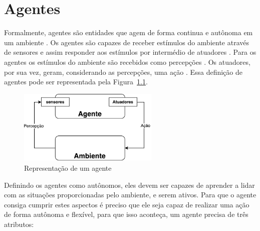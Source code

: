 \chapter{\label{chap:agentes}Agentes}


Formalmente, agentes são entidades que agem de forma continua e autônoma em um ambiente \cite{agent1993oriented}. 
Os agentes são capazes de receber estímulos do ambiente através de sensores e assim responder aos estímulos por intermédio de atuadores \cite{intelligence2003modern}. 
Para os agentes os estímulos do ambiente são recebidos como percepções \cite{intelligence2003modern}. 
Os atuadores, por sua vez, geram, considerando as percepções, uma ação \cite{intelligence2003modern}. 
Essa definição de agentes pode ser representada pela Figura~\ref{fig:agente}.

\begin{figure}[ht]
	\centering
	\includegraphics[width=0.6\textwidth]{fig/agente.pdf}
	\caption{Representação de um agente}
	\label{fig:agente}
\end{figure} 

Definindo os agentes como autônomos, eles devem ser capazes de aprender a lidar com as situações proporcionadas pelo ambiente, e serem ativos. 
Para que o agente consiga cumprir estes aspectos é preciso que ele seja capaz de realizar uma ação de forma autônoma e flexível, para que isso aconteça, um agente precisa de três atributos\cite{agent1999}: 


